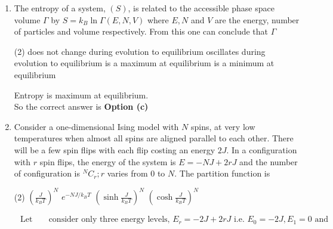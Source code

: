\begin{enumerate}
\begin{answer}
\begin{align*}
\text{ and }n_{2}=0,1,2,3 \ldots .\\
\intertext{	Ground state energy $E=\frac{3 \hbar \omega_{1}}{2}$, first excited state energy $E=\frac{5 \hbar \omega_{1}}{2}$. Second excited state energy $E=\frac{7 \hbar \omega_{1}}{2}$ which is doubly degenerate state so $g=2$, other state have more energy than $4 \hbar \omega_{1}$.}
	P\left(E<4 \hbar \omega_{1}\right)&=\frac{e^{-\frac{3 \beta \hbar \omega_{1}}{2}}+e^{-\frac{5 \beta \hbar \omega_{1}}{2}}+2 e^{-\frac{7 \beta \hbar \omega_{1}}{2}}}{Z}=\frac{x^{3 / 2}\left(1+x+2 x^{2}\right)}{Z}\text{ where }x=e^{-\beta \hbar \omega_{1}} .
	\end{align*}
	So the correct answer is \textbf{Option (d)}
\end{answer}
\item 	The entropy of a system, $(S)$, is related to the accessible phase space volume $\Gamma$ by $S=k_{B} \ln \Gamma(E, N, V)$ where $E, N$ and $V$ are the energy, number of particles and volume respectively. From this one can conclude that $\Gamma$
	 \begin{tasks}(2)
		\task[\textbf{a.}]does not change during evolution to equilibrium
		\task[\textbf{b.}]oscillates during evolution to equilibrium
		\task[\textbf{c.}]is a maximum at equilibrium
		\task[\textbf{d.}]is a minimum at equilibrium 
	\end{tasks}
\begin{answer}
	Entropy is maximum at equilibrium.\\
		So the correct answer is \textbf{Option (c)}
\end{answer}
\item 	Consider a one-dimensional Ising model with $N$ spins, at very low temperatures when almost all spins are aligned parallel to each other. There will be a few spin flips with each flip costing an energy $2 J$. In a configuration with $r$ spin flips, the energy of the system is $E=-N J+2 r J$ and the number of configuration is ${ }^{N} C_{r} ; r$ varies from 0 to $N$. The partition function is
	 \begin{tasks}(2)
		\task[\textbf{a.}] $\left(\frac{J}{k_{B} T}\right)^{N}$
		\task[\textbf{b.}]$e^{-N J / k_{B} T}$
		\task[\textbf{c.}] $\left(\sinh \frac{J}{k_{B} T}\right)^{N}$
		\task[\textbf{d.}] $\left(\cosh \frac{J}{k_{B} T}\right)^{N}$
	\end{tasks}
\begin{answer}
	\begin{align*}
	\text { Let us}&\text{ consider only three energy levels, } E_{r}=-2 J+2 r J \text { i.e. } E_{0}=-2 J, E_{1}=0 \text { and }\\

\end{align*}
\end{answer}
\end{enumerate}
